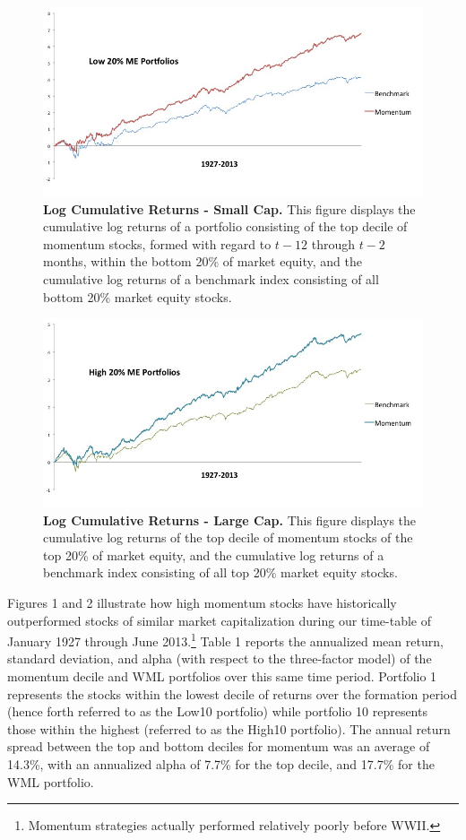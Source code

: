 \documentclass[12pt]{article}
\begin{document}
\begin{figure}[p]%
\centering
\caption{\textbf{Log Cumulative Returns - Small Cap.} {\footnotesize This figure displays the cumulative log returns of a portfolio consisting of the top decile of momentum stocks, formed with regard to $t-12$ through $t-2$ months, within the bottom 20\% of market equity, and the cumulative log returns of a benchmark index consisting of all bottom 20\% market equity stocks.}}
\includegraphics[scale=0.52]{Lo20.jpg}
\end{figure}
\begin{figure}[p]
\centering
\caption{\textbf{Log Cumulative Returns - Large Cap.} {\footnotesize This figure displays the cumulative log returns of the top decile of momentum stocks of the top 20\% of market equity, and the cumulative log returns of a benchmark index consisting of all top 20\% market equity stocks.}}
\includegraphics[scale=0.52]{Hi20.jpg}
\end{figure}

Figures 1 and 2 illustrate how high momentum stocks have historically outperformed stocks of similar market capitalization during our time-table of January 1927 through June 2013.\footnote{Momentum strategies actually performed relatively poorly before WWII.} Table 1 reports the annualized mean return, standard deviation, and alpha (with respect to the three-factor model) of the momentum decile and WML portfolios over this same time period. Portfolio 1 represents the stocks within the lowest decile of returns over the formation period (hence forth referred to as the Low10 portfolio) while portfolio 10 represents those within the highest (referred to as the High10 portfolio). The annual return spread between the top and bottom deciles for momentum was an average of 14.3\%, with an annualized alpha of 7.7\% for the top decile, and 17.7\% for the WML portfolio. 
\end{document}
